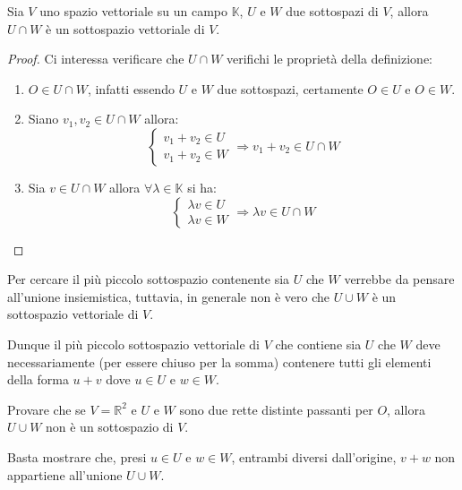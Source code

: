 \begin{proposition}
	Sia $V$ uno spazio vettoriale su un campo $\mathbb{K}$, $U$ e $W$ due
	sottospazi di $V$, allora $U \cap W$ \`e un sottospazio vettoriale di $V$.
	\begin{proof}
		Ci interessa verificare che $U \cap W$ verifichi le propriet\`a della
		definizione:
		\begin{enumerate}
			\item $O \in U \cap W$, infatti essendo $U$ e $W$ due sottospazi,
			      certamente $O \in U$ e $O \in W$.
			\item Siano $v_1, v_2 \in U \cap W$ allora:
			      \begin{equation*}
				      \begin{cases}
					      v_1 + v_2 \in U \\
					      v_1 + v_2 \in W
				      \end{cases}
				      \Rightarrow{v_1 + v_2 \in U \cap W}
			      \end{equation*}
			\item Sia $v \in U \cap W$ allora $\forall \lambda \in
				      \mathbb{K}$ si ha:
			      \begin{equation*}
				      \begin{cases}
					      \lambda v \in U \\
					      \lambda v \in W
				      \end{cases}
				      \Rightarrow{\lambda v \in U \cap W}
			      \end{equation*}
		\end{enumerate}
	\end{proof}
\end{proposition}

Per cercare il pi\`u piccolo sottospazio contenente sia $U$ che $W$
verrebbe da pensare all'unione insiemistica, tuttavia, in generale non
\`e vero che $U \cup W$ \`e un sottospazio vettoriale di $V$.

Dunque il pi\`u piccolo sottospazio vettoriale di $V$ che contiene sia
$U$ che $W$ deve necessariamente (per essere chiuso per la somma)
contenere tutti gli elementi della forma $u + v$ dove $u \in U$ e
$w \in W$.

\begin{example}
	Provare che se $V = \mathbb{R}^2$ e $U$ e $W$ sono due rette distinte
	passanti per $O$, allora $U \cup W$ non \`e un sottospazio di $V$.

	Basta mostrare che, presi $u \in U$ e $w \in W$, entrambi diversi
	dall'origine, $v + w$ non appartiene all'unione $U \cup W$.
\end{example}

